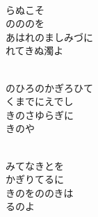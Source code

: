 \documentclass[10pt,b5j]{tarticle} %
\begin{document}
\vspace{1.5em} %
\newcommand{\linespace}{0.5em} %
\newcommand{\blocksize}{0.5\hsize} %
\newcommand{\itemmargin}{3em} %
\begin{enumerate} %
    \setlength{\itemindent}{\itemmargin} %
    \begin{minipage}[c]{\blocksize}
    
        \vspace{\linespace}
        \item~\\
        らぬこそ\\
        のののを\\
        あはれのましみづに\\
        れてきぬ濁よ
        
    \end{minipage}
    \begin{minipage}[c]{\blocksize}
        
        \vspace{\linespace}
        \item~\\
        のひろのかぎろひて\\
        くまでにえでし\\
        きのさゆらぎに\\
        きのや
        
    \end{minipage}
    \begin{minipage}[c]{\blocksize}
        
        \vspace{\linespace}
        \item~\\
        みてなきとを\\
        かぎりてるに\\
        きのをののきは\\
        るのよ
        

\end{minipage}
\end{enumerate}
\end{document}
